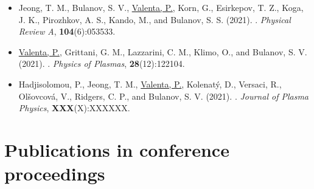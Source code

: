 \documentclass[10pt, a4paper, twoside, openright]{report}
\newcommand{\link}[3][blue]{\href{#2}{\color{#1}{#3}}}%
\begin{document}
\begin{itemize}
	\item Jeong, T. M., Bulanov, S. V., \underline{Valenta, P.}, Korn, G., Esirkepov, T. Z., Koga, J. K., Pirozhkov, A. S., Kando, M., and Bulanov, S. S. (2021). \link{http://dx.doi.org/10.1103/PhysRevA.104.053533}{Relativistic-flying laser focus by a laser-produced parabolic plasma mirror}. \textit{Physical Review A}, \textbf{104}(6):053533.
	
	\item \underline{Valenta, P.}, Grittani, G. M., Lazzarini, C. M., Klimo, O., and Bulanov, S. V. (2021). \link{http://dx.doi.org/10.1063/5.0065167}{On the electromagnetic-electron rings originating from the interaction of high-power short-pulse laser and underdense plasma}. \textit{Physics of Plasmas}, \textbf{28}(12):122104.
	
	\item Hadjisolomou, P., Jeong, T. M., \underline{Valenta, P.}, Kolenatý, D., Versaci, R., Olšovcová, V., Ridgers, C. P., and Bulanov, S. V. (2021). \link{http://dx.doi.org/}{Gamma-ray flash in the interaction of a tightly focused single-cycle ultraintense laser pulse with a solid target}. \textit{Journal of Plasma Physics}, \textbf{XXX}(X):XXXXXX.
	
\end{itemize}

\section{Publications in conference proceedings\label{sec:conference_proceedings}}
\end{document}
